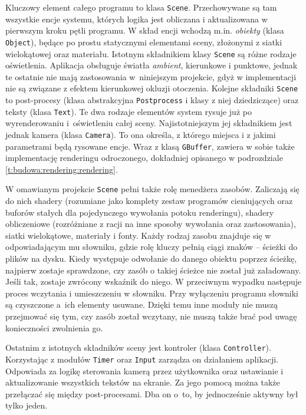 	Kluczowy element całego programu to klasa \texttt{Scene}. Przechowywane są tam wszystkie encje systemu, których logika jest obliczana i aktualizowana w pierwszym kroku pętli programu. W skład encji wchodzą m.in. \emph{obiekty} (klasa \texttt{Object}), będące po prostu statycznymi elementami sceny, złożonymi z siatki wielokątowej oraz materiału. Istotnym składnikiem klasy \texttt{Scene} są różne rodzaje oświetlenia. Aplikacja obsługuje światła \emph{ambient}, kierunkowe i punktowe, jednak te ostatnie nie mają zastosowania w~niniejszym projekcie, gdyż w implementacji nie są związane z efektem kierunkowej okluzji otoczenia. Kolejne składniki \texttt{Scene} to post-procesy (klasa abstrakcyjna \texttt{Postprocess} i klasy z niej dziedziczące) oraz teksty (klasa \texttt{Text}). Te dwa rodzaje elementów system rysuje już po wyrenderowaniu i~oświetleniu całej sceny. Najistotniejszym jej składnikiem jest jednak kamera (klasa \texttt{Camera}). To ona określa, z którego miejsca i z jakimi parametrami będą rysowane encje. Wraz z klasą \texttt{GBuffer}, zawiera w sobie także implementację renderingu odroczonego, dokładniej opisanego w podrozdziale \ref{t:budowa:rendering:rendering}.
	
	W omawianym projekcie \texttt{Scene} pełni także rolę menedżera zasobów. Zaliczają się do nich shadery (rozumiane jako komplety zestaw programów cieniujących oraz buforów stałych dla pojedynczego wywołania potoku renderingu), shadery obliczeniowe (rozróżniane z racji na inne sposoby wywołania oraz zastosowania), siatki wielokątowe, materiały i fonty. Każdy rodzaj zasobu znajduje się w odpowiadającym mu słowniku, gdzie rolę kluczy pełnią ciągi znaków -- ścieżki do plików na dysku. Kiedy występuje odwołanie do danego obiektu poprzez ścieżkę, najpierw zostaje sprawdzone, czy zasób o takiej ścieżce nie został już załadowany. Jeśli tak, zostaje zwrócony wskaźnik do niego. W przeciwnym wypadku następuje proces wczytania i umieszczeniu w słowniku. Przy wyłączeniu programu słowniki są czyszczone a~ich elementy usuwane. Dzięki temu inne moduły nie muszą przejmować się tym, czy zasób został wczytany, nie muszą także brać pod uwagę konieczności zwolnienia go.
	
	Ostatnim z istotnych składników sceny jest kontroler (klasa \texttt{Controller}). Korzystając z modułów \texttt{Timer} oraz \texttt{Input} zarządza on działaniem aplikacji. Odpowiada za logikę sterowania kamerą przez użytkownika oraz ustawianie i aktualizowanie wszystkich tekstów na ekranie. Za jego pomocą można także przełączać się między post-procesami. Dba on o~to, by jednocześnie aktywny był tylko jeden.
	
